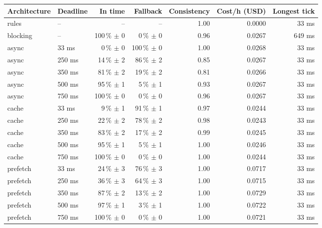 \begin{tabular}{llrrrrr}
\toprule
Architecture & Deadline & In time & Fallback & Consistency & Cost/h (USD) & Longest tick \\
\midrule
rules & -- & -- & -- & 1.00 & 0.0000 & 33 ms \\
blocking & -- & 100\,\% $\pm$ 0 & 0\,\% $\pm$ 0 & 0.96 & 0.0267 & 649 ms \\
async & 33 ms & 0\,\% $\pm$ 0 & 100\,\% $\pm$ 0 & 1.00 & 0.0268 & 33 ms \\
async & 250 ms & 14\,\% $\pm$ 2 & 86\,\% $\pm$ 2 & 0.85 & 0.0267 & 33 ms \\
async & 350 ms & 81\,\% $\pm$ 2 & 19\,\% $\pm$ 2 & 0.81 & 0.0266 & 33 ms \\
async & 500 ms & 95\,\% $\pm$ 1 & 5\,\% $\pm$ 1 & 0.93 & 0.0267 & 33 ms \\
async & 750 ms & 100\,\% $\pm$ 0 & 0\,\% $\pm$ 0 & 0.96 & 0.0267 & 33 ms \\
cache & 33 ms & 9\,\% $\pm$ 1 & 91\,\% $\pm$ 1 & 0.97 & 0.0244 & 33 ms \\
cache & 250 ms & 22\,\% $\pm$ 2 & 78\,\% $\pm$ 2 & 0.98 & 0.0243 & 33 ms \\
cache & 350 ms & 83\,\% $\pm$ 2 & 17\,\% $\pm$ 2 & 0.99 & 0.0245 & 33 ms \\
cache & 500 ms & 95\,\% $\pm$ 1 & 5\,\% $\pm$ 1 & 1.00 & 0.0246 & 33 ms \\
cache & 750 ms & 100\,\% $\pm$ 0 & 0\,\% $\pm$ 0 & 1.00 & 0.0244 & 33 ms \\
prefetch & 33 ms & 24\,\% $\pm$ 3 & 76\,\% $\pm$ 3 & 1.00 & 0.0717 & 33 ms \\
prefetch & 250 ms & 36\,\% $\pm$ 3 & 64\,\% $\pm$ 3 & 1.00 & 0.0715 & 33 ms \\
prefetch & 350 ms & 87\,\% $\pm$ 2 & 13\,\% $\pm$ 2 & 1.00 & 0.0729 & 33 ms \\
prefetch & 500 ms & 97\,\% $\pm$ 1 & 3\,\% $\pm$ 1 & 1.00 & 0.0722 & 33 ms \\
prefetch & 750 ms & 100\,\% $\pm$ 0 & 0\,\% $\pm$ 0 & 1.00 & 0.0721 & 33 ms \\
\bottomrule
\end{tabular}
